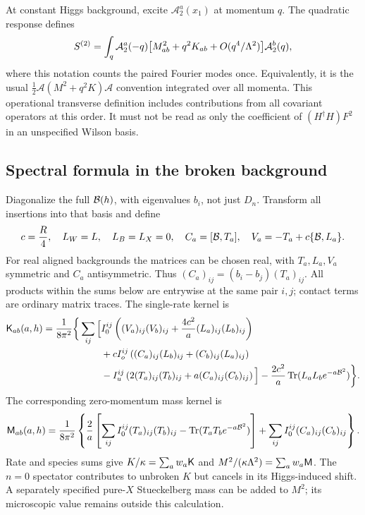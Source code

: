 \documentclass[11pt,letterpaper]{article}
\DeclareMathOperator{\Tr}{Tr}\DeclareMathOperator{\diag}{diag}
\newcommand{\mm}{\mathsf M}
\begin{document}
At constant Higgs background, excite $\mathcal A_2^a(x_1)$ at momentum $q$. The quadratic response defines
\begin{equation}
 S^{(2)}=\int_q\mathcal A_2^a(-q)
       \bigl[M_{ab}^2+q^2K_{ab}+O(q^4/\Lambda^2)\bigr]
       \mathcal A_2^b(q),\label{eq:operational}
\end{equation}
where this notation counts the paired Fourier modes once. Equivalently, it is the usual $\frac12\mathcal A(M^2+q^2K)\mathcal A$ convention integrated over all momenta. This operational transverse definition includes contributions from all covariant operators at this order. It must not be read as only the coefficient of $(H^\dagger H)F^2$ in an unspecified Wilson basis.

\subsection{Spectral formula in the broken background}

Diagonalize the full $\mathcal B(h)$, with eigenvalues $b_i$, not just $D_n$. Transform all insertions into that basis and define
\begin{equation}
 c=\frac R4,\quad L_W=L,\quad L_B=L_X=0,\quad
 C_a=[\mathcal B,T_a],\quad V_a=-T_a+c\{\mathcal B,L_a\}.
\end{equation}
For real aligned backgrounds the matrices can be chosen real, with $T_a,L_a,V_a$ symmetric and $C_a$ antisymmetric. Thus $(C_a)_{ij}=(b_i-b_j)(T_a)_{ij}$. All products within the sums below are entrywise at the same pair $i,j$; contact terms are ordinary matrix traces. The single-rate kernel is
\begin{align}
 \kk_{ab}(a,h)=\frac1{8\pi^2}\bigg\{\sum_{ij}\Big[&
 I_0^{ij}\left((V_a)_{ij}(V_b)_{ij}+\frac{4c^2}{a}(L_a)_{ij}(L_b)_{ij}\right)\nonumber\\
 &+cI_o^{ij}\left((C_a)_{ij}(L_b)_{ij}+(C_b)_{ij}(L_a)_{ij}\right)\nonumber\\
 &-I_u^{ij}\left(2(T_a)_{ij}(T_b)_{ij}+a(C_a)_{ij}(C_b)_{ij}\right)\Big]
 -\frac{2c^2}{a}\Tr(L_aL_b e^{-a\B^2})\bigg\}.\label{eq:Kmaster}
\end{align}
The corresponding zero-momentum mass kernel is
\begin{equation}
 \mm_{ab}(a,h)=\frac1{8\pi^2}\left\{\frac2a\left[
 \sum_{ij}I_0^{ij}(T_a)_{ij}(T_b)_{ij}-\Tr(T_aT_b e^{-a\B^2})\right]
 +\sum_{ij}I_0^{ij}(C_a)_{ij}(C_b)_{ij}\right\}.
 \label{eq:Mmaster}
\end{equation}
Rate and species sums give $K/\kappa=\sum_aw_a\mathsf K$ and $M^2/(\kappa\Lam^2)=\sum_aw_a\mm$. The $n=0$ spectator contributes to unbroken $K$ but cancels in its Higgs-induced shift. A separately specified pure-$X$ Stueckelberg mass can be added to $M^2$; its microscopic value remains outside this calculation.
\end{document}
